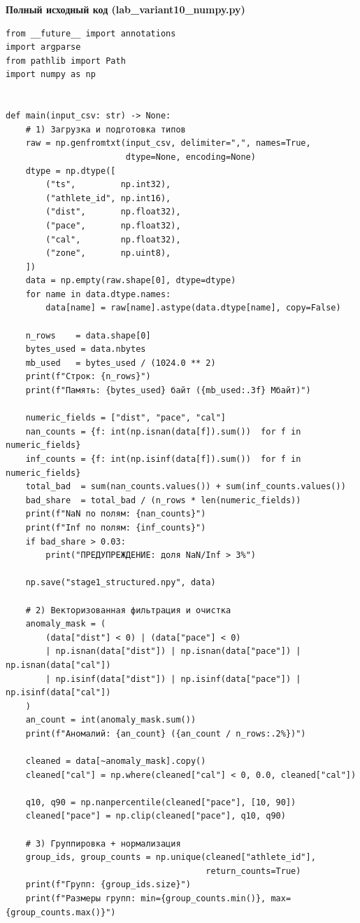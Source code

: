 \documentclass[oneside,a4paper,14pt]{extarticle}
\begin{document}
\newpage
\textbf{Полный исходный код (lab\_variant10\_numpy.py)}
\small
\begin{verbatim}
from __future__ import annotations
import argparse
from pathlib import Path
import numpy as np


def main(input_csv: str) -> None:
    # 1) Загрузка и подготовка типов
    raw = np.genfromtxt(input_csv, delimiter=",", names=True,
                        dtype=None, encoding=None)
    dtype = np.dtype([
        ("ts",         np.int32),
        ("athlete_id", np.int16),
        ("dist",       np.float32),
        ("pace",       np.float32),
        ("cal",        np.float32),
        ("zone",       np.uint8),
    ])
    data = np.empty(raw.shape[0], dtype=dtype)
    for name in data.dtype.names:
        data[name] = raw[name].astype(data.dtype[name], copy=False)

    n_rows    = data.shape[0]
    bytes_used = data.nbytes
    mb_used   = bytes_used / (1024.0 ** 2)
    print(f"Строк: {n_rows}")
    print(f"Память: {bytes_used} байт ({mb_used:.3f} Мбайт)")

    numeric_fields = ["dist", "pace", "cal"]
    nan_counts = {f: int(np.isnan(data[f]).sum())  for f in numeric_fields}
    inf_counts = {f: int(np.isinf(data[f]).sum())  for f in numeric_fields}
    total_bad  = sum(nan_counts.values()) + sum(inf_counts.values())
    bad_share  = total_bad / (n_rows * len(numeric_fields))
    print(f"NaN по полям: {nan_counts}")
    print(f"Inf по полям: {inf_counts}")
    if bad_share > 0.03:
        print("ПРЕДУПРЕЖДЕНИЕ: доля NaN/Inf > 3%")

    np.save("stage1_structured.npy", data)

    # 2) Векторизованная фильтрация и очистка
    anomaly_mask = (
        (data["dist"] < 0) | (data["pace"] < 0)
        | np.isnan(data["dist"]) | np.isnan(data["pace"]) | np.isnan(data["cal"])
        | np.isinf(data["dist"]) | np.isinf(data["pace"]) | np.isinf(data["cal"])
    )
    an_count = int(anomaly_mask.sum())
    print(f"Аномалий: {an_count} ({an_count / n_rows:.2%})")

    cleaned = data[~anomaly_mask].copy()
    cleaned["cal"] = np.where(cleaned["cal"] < 0, 0.0, cleaned["cal"])

    q10, q90 = np.nanpercentile(cleaned["pace"], [10, 90])
    cleaned["pace"] = np.clip(cleaned["pace"], q10, q90)

    # 3) Группировка + нормализация
    group_ids, group_counts = np.unique(cleaned["athlete_id"],
                                        return_counts=True)
    print(f"Групп: {group_ids.size}")
    print(f"Размеры групп: min={group_counts.min()}, max={group_counts.max()}")


\end{verbatim}
\end{document}
